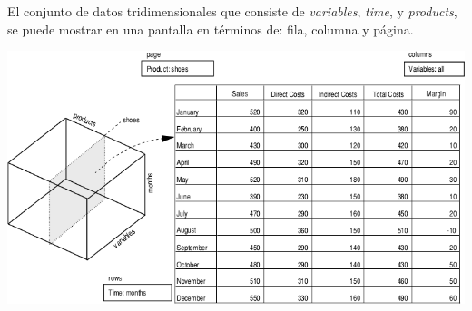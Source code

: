 \documentclass{fancyslides}
\begin{document}
\begin{frame}
\misc
{
El conjunto de datos tridimensionales que consiste de \textit{variables}, \textit{time}, y \textit{products}, se puede mostrar en una pantalla en términos de: fila, columna y página.

\begin{center}
\includegraphics[scale=0.3]{cube_3}
\end{center}

}
\end{frame}
% 
% 
% 
% 
% 
% 
% 
\end{document}

